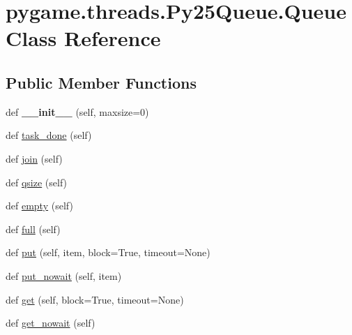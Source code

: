 \hypertarget{classpygame_1_1threads_1_1_py25_queue_1_1_queue}{}\section{pygame.\+threads.\+Py25\+Queue.\+Queue Class Reference}
\label{classpygame_1_1threads_1_1_py25_queue_1_1_queue}
\subsection*{Public Member Functions}
\begin{DoxyCompactItemize}
\item 
\mbox{\label{classpygame_1_1threads_1_1_py25_queue_1_1_queue_a862993ea96c2b43a1bc75e81fb0efbd3}} 
def {\bfseries \+\_\+\+\_\+init\+\_\+\+\_\+} (self, maxsize=0)
\item 
def \hyperlink{classpygame_1_1threads_1_1_py25_queue_1_1_queue_a3782c6554b781ce5bb83a9aaaa34ef88}{task\+\_\+done} (self)
\item 
def \hyperlink{classpygame_1_1threads_1_1_py25_queue_1_1_queue_a684afbc471faf948431e81f522fe3288}{join} (self)
\item 
def \hyperlink{classpygame_1_1threads_1_1_py25_queue_1_1_queue_a52b9f05689a1763988cf9d703c247528}{qsize} (self)
\item 
def \hyperlink{classpygame_1_1threads_1_1_py25_queue_1_1_queue_aaf241b970bb013ab6e4eb8733a4a07a5}{empty} (self)
\item 
def \hyperlink{classpygame_1_1threads_1_1_py25_queue_1_1_queue_a6f2dee535a3ee309c849e6d9485e1e7b}{full} (self)
\item 
def \hyperlink{classpygame_1_1threads_1_1_py25_queue_1_1_queue_a08a34ad15e2d0e5badf8a6e3b2226c56}{put} (self, item, block=True, timeout=None)
\item 
def \hyperlink{classpygame_1_1threads_1_1_py25_queue_1_1_queue_ae0fb745e2e4e17fe2083a10eb47906f3}{put\+\_\+nowait} (self, item)
\item 
def \hyperlink{classpygame_1_1threads_1_1_py25_queue_1_1_queue_aac6f6190f4dc098936995bb560faedba}{get} (self, block=True, timeout=None)
\item 
def \hyperlink{classpygame_1_1threads_1_1_py25_queue_1_1_queue_a2f78bfd6cdb4a12d8eb82418bc4d29f7}{get\+\_\+nowait} (self)
\end{DoxyCompactItemize}
